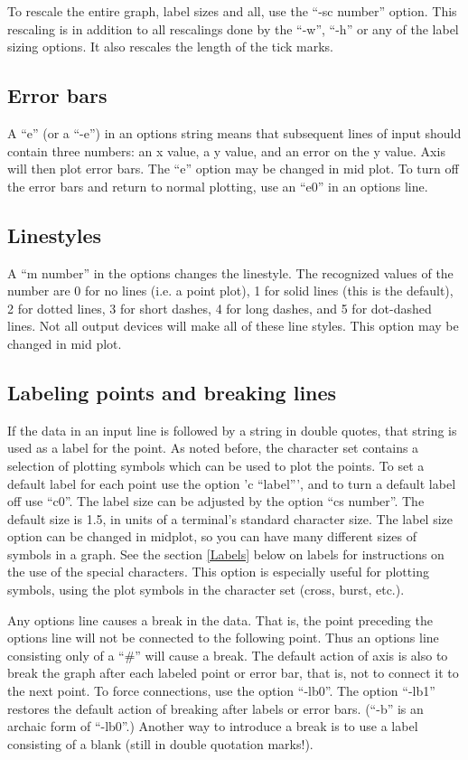 To rescale the entire graph, label sizes and all, use the ``-sc number''
option.  This rescaling is in addition to all rescalings done by
the ``-w'', ``-h'' or any of the label sizing options.  It also rescales
the length of the tick marks.

\subsection{Error bars}
A ``e'' (or a ``-e'') in an options string means that subsequent lines of
input should contain three numbers: an x value, a y value, and an error
on the y value.  Axis will then plot error bars.  The ``e'' option may
be changed in mid plot.  To turn off the
error bars and return to normal plotting, use an ``e0'' in an options
line.

\subsection{Linestyles}
A ``m number'' in the options changes the linestyle.  The recognized
values of the number are 0 for no lines (i.e. a point plot), 1 for
solid lines (this is the default), 2 for dotted lines, 3 for short
dashes, 4 for long dashes, and 5 for dot-dashed lines.  Not all output
devices will make all of these line styles.  This option may be 
changed in mid plot.

\subsection{Labeling points and breaking lines}
If the data in an input line is followed by a string in double quotes,
that string is used as a label for the point.  As noted before, the
character set contains a selection of plotting symbols which can be
used to plot the points.  To set a default label for each point
use the option 'c ``label''', and to turn a default label off
use ``c0''.  The label size can be adjusted by the option
``cs number''.  The default size is 1.5, in units of a terminal's
standard character size.
The label size option can be changed in midplot, so you can have
many different sizes of symbols in a graph.
See the section \ref{Labels} below on labels for
instructions on the use of the special characters.
This option is especially useful for plotting symbols, using the plot
symbols in the character set (cross, burst, etc.).

Any options line causes a break in the data.  That is, the point preceding
the options line will not be connected to the following point.
Thus an options line consisting only of a ``\#'' will cause a break.
The default action of axis is also to break the graph after each labeled
point or error bar, that is, not to connect it to the next point.  To force
connections, use the option ``-lb0''.
The option ``-lb1'' restores the default action of breaking after labels
or error bars.  (``-b'' is an archaic form of ``-lb0''.)
Another way to introduce a break is to use a label consisting of a blank
(still in double quotation marks!).

